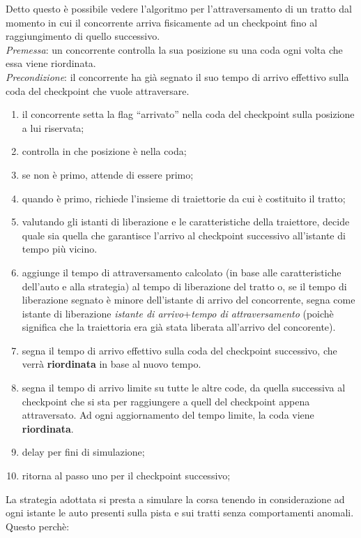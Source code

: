 Detto questo \`{e} possibile vedere l'algoritmo per l'attraversamento di un tratto dal momento in cui il concorrente arriva fisicamente ad un checkpoint
fino al raggiungimento di quello successivo.\\
\emph{Premessa}: un concorrente controlla la sua posizione su una coda ogni volta che essa viene riordinata.\\
\emph{Precondizione}: il concorrente ha gi\`{a} segnato il suo tempo di arrivo effettivo sulla coda del checkpoint che vuole attraversare.
\begin{enumerate}
\item il concorrente setta la flag ``arrivato'' nella coda del checkpoint sulla posizione a lui riservata;
\item controlla in che posizione \`{e} nella coda;
\item se non \`{e} primo, attende di essere primo;
\item quando \`{e} primo, richiede l'insieme di traiettorie da cui \`{e} costituito il tratto;
\item valutando gli istanti di liberazione e le caratteristiche della traiettore, decide quale sia quella che garantisce l'arrivo al checkpoint
successivo all'istante di tempo pi\`{u} vicino.
\item aggiunge il tempo di attraversamento calcolato (in base alle caratteristiche dell'auto e alla strategia) al tempo di liberazione del tratto o, 
se il tempo di liberazione segnato \`{e} minore dell'istante di arrivo del concorrente, segna come istante di liberazione \emph{istante di arrivo}+\emph{tempo
di attraversamento} (poich\`{e} significa che la traiettoria era gi\`{a} stata liberata all'arrivo del concorente).
\item segna il tempo di arrivo effettivo sulla coda del checkpoint successivo, che verr\`{a} \textbf{riordinata} in base al nuovo tempo.
\item segna il tempo di arrivo limite su tutte le altre code, da quella successiva al checkpoint che si sta per raggiungere a quell del checkpoint
appena attraversato. Ad ogni aggiornamento del tempo limite, la coda viene \textbf{riordinata}.
\item delay per fini di simulazione;
\item ritorna al passo uno per il checkpoint successivo;
\end{enumerate}
La strategia adottata si presta a simulare la corsa tenendo in considerazione ad ogni istante le auto presenti sulla pista e sui tratti senza comportamenti
anomali. Questo perch\`{e}:
